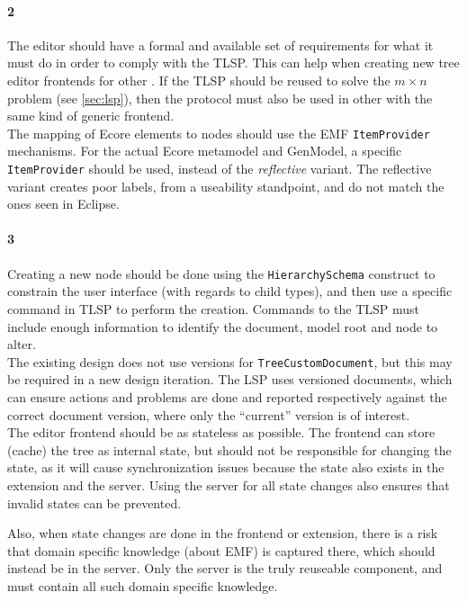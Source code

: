 \paragraph{2} The editor should have a formal and available set of requirements for what it must do in order to comply with the \acrshort{TLSP}.
This can help when creating new tree editor frontends for other .
If the \acrshort{TLSP} should be reused to solve the \(m \times n\) problem (see \cref{sec:lsp}), then the protocol must also be used in other  with the same kind of generic frontend.\\

The mapping of \gls{Ecore} elements to nodes should use the \acrshort{EMF} \texttt{ItemProvider} mechanisms.
For the actual \gls{Ecore} metamodel and GenModel, a specific \texttt{ItemProvider} should be used, instead of the \textit{reflective} variant.
The reflective variant creates poor labels, from a useability standpoint, and do not match the ones seen in \gls{Eclipse}.


\paragraph{3} Creating a new node should be done using the \texttt{HierarchySchema} construct to constrain the user interface (with regards to child types), and then use a specific command in \acrshort{TLSP} to perform the creation.
Commands to the \acrshort{TLSP} must include enough information to identify the document, model root and node to alter.\\

The existing design does not use versions for \texttt{TreeCustomDocument}, but this may be required in a new design iteration.
The \acrshort{LSP} uses versioned documents, which can ensure actions and problems are done and reported respectively against the correct document version, where only the ``current'' version is of interest.\\

The editor frontend should be as stateless as possible.
The frontend can store (cache) the tree as internal state, but should not be responsible for changing the state, as it will cause synchronization issues because the state also exists in the extension and the server.
Using the server for all state changes also ensures that invalid states can be prevented.

Also, when state changes are done in the frontend or extension, there is a risk that domain specific knowledge (about \acrshort{EMF}) is captured there, which should instead be in the server.
Only the server is the truly reuseable component, and must contain all such domain specific knowledge.


